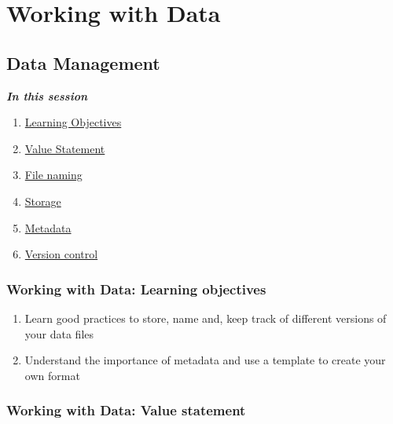 \documentclass[
]{book}
\providecommand{\tightlist}{%
  \setlength{\itemsep}{0pt}\setlength{\parskip}{0pt}}
\begin{document}
\hypertarget{working-with-data}{%
\chapter{Working with Data}\label{working-with-data}}

\hypertarget{data-management}{%
\section{Data Management}\label{data-management}}

\textbf{\emph{In this session}}

\begin{enumerate}
\def\labelenumi{\arabic{enumi}.}
\tightlist
\item
  \protect\hyperlink{working-with-data-learning-objectives}{Learning Objectives}
\item
  \protect\hyperlink{working-with-data-value-statement}{Value Statement}
\item
  \protect\hyperlink{file-naming}{File naming}
\item
  \protect\hyperlink{storage}{Storage}
\item
  \protect\hyperlink{metadata}{Metadata}
\item
  \protect\hyperlink{version-control}{Version control}
\end{enumerate}

\hypertarget{working-with-data-learning-objectives}{%
\subsection{Working with Data: Learning objectives}\label{working-with-data-learning-objectives}}

\begin{enumerate}
\def\labelenumi{\arabic{enumi}.}
\item
  Learn good practices to store, name and, keep track of different versions of your data files
\item
  Understand the importance of metadata and use a template to create your own format
\end{enumerate}

\hypertarget{working-with-data-value-statement}{%
\subsection{Working with Data: Value statement}\label{working-with-data-value-statement}}
\end{document}
